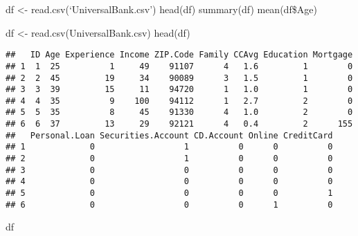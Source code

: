 \documentclass[
]{article}
\author{}
\date{\vspace{-2.5em}}
\newenvironment{Shaded}{\begin{snugshade}}{\end{snugshade}}
\newcommand{\FunctionTok}[1]{\textcolor[rgb]{0.00,0.00,0.00}{#1}}
\newcommand{\NormalTok}[1]{#1}
\newcommand{\OtherTok}[1]{\textcolor[rgb]{0.56,0.35,0.01}{#1}}
\newcommand{\StringTok}[1]{\textcolor[rgb]{0.31,0.60,0.02}{#1}}
\begin{document}
df \textless- read.csv(`UniversalBank.csv') head(df) summary(df)
mean(df\$Age)

\begin{Shaded}
\begin{Highlighting}[]
\NormalTok{df }\OtherTok{\textless{}{-}} \FunctionTok{read.csv}\NormalTok{(}\StringTok{\textquotesingle{}UniversalBank.csv\textquotesingle{}}\NormalTok{)}
\FunctionTok{head}\NormalTok{(df)}
\end{Highlighting}
\end{Shaded}

\begin{verbatim}
##   ID Age Experience Income ZIP.Code Family CCAvg Education Mortgage
## 1  1  25          1     49    91107      4   1.6         1        0
## 2  2  45         19     34    90089      3   1.5         1        0
## 3  3  39         15     11    94720      1   1.0         1        0
## 4  4  35          9    100    94112      1   2.7         2        0
## 5  5  35          8     45    91330      4   1.0         2        0
## 6  6  37         13     29    92121      4   0.4         2      155
##   Personal.Loan Securities.Account CD.Account Online CreditCard
## 1             0                  1          0      0          0
## 2             0                  1          0      0          0
## 3             0                  0          0      0          0
## 4             0                  0          0      0          0
## 5             0                  0          0      0          1
## 6             0                  0          0      1          0
\end{verbatim}

\begin{Shaded}
\begin{Highlighting}[]
\NormalTok{df}
\end{Highlighting}
\end{Shaded}
\end{document}
